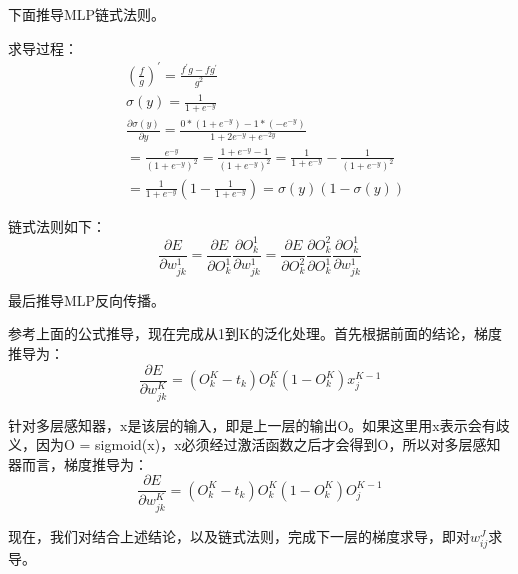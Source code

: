 \documentclass{ctexart}
\begin{document}
\par 下面推导MLP链式法则。
\par 求导过程：
\begin{equation}
    \begin{aligned}
    &\left(\frac{f}{g}\right)^{\prime}=\frac{f^{\prime} g-f g^{\prime}}{g^{2}} \\
    &\sigma(y)=\frac{1}{1+e^{-y}} \\
    &\frac{\partial \sigma(y)}{\partial y}=\frac{0 *\left(1+e^{-y}\right)-1 *\left(-e^{-y}\right)}{1+2 e^{-y}+e^{-2 y}} \\
    &=\frac{e^{-y}}{\left(1+e^{-y}\right)^{2}}=\frac{1+e^{-y}-1}{\left(1+e^{-y}\right)^{2}}=\frac{1}{1+e^{-y}}-\frac{1}{\left(1+e^{-y}\right)^{2}} \\
    &=\frac{1}{1+e^{-y}}\left(1-\frac{1}{1+e^{-y}}\right)=\sigma(y)(1-\sigma(y))
    \end{aligned}
    \end{equation}
\par 链式法则如下：
\begin{equation}
    \frac{\partial E}{\partial w_{j k}^{1}}=\frac{\partial E}{\partial O_{k}^{1}} \frac{\partial O_{k}^{1}}{\partial w_{j k}^{1}}=\frac{\partial E}{\partial O_{k}^{2}} \frac{\partial O_{k}^{2}}{\partial O_{k}^{1}} \frac{\partial O_{k}^{1}}{\partial w_{j k}^{1}}
\end{equation}
\par 最后推导MLP反向传播。
\par 参考上面的公式推导，现在完成从1到K的泛化处理。首先根据前面的结论，梯度推导为：
\begin{equation}
    \frac{\partial E}{\partial w_{j k}^{K}}=\left(O_{k}^{K}-t_{k}\right) O_{k}^{K}\left(1-O_{k}^{K}\right) x_{j}^{K-1}
    \end{equation}
\par 针对多层感知器，x是该层的输入，即是上一层的输出O。如果这里用x表示会有歧义，因为O = sigmoid(x)，x必须经过激活函数之后才会得到O，所以对多层感知器而言，梯度推导为：
\begin{equation}
    \frac{\partial E}{\partial w_{j k}^{K}}=\left(O_{k}^{K}-t_{k}\right) O_{k}^{K}\left(1-O_{k}^{K}\right) O_{j}^{K-1}
    \end{equation}
\par 现在，我们对结合上述结论，以及链式法则，完成下一层的梯度求导，即对$w_{i j}^{J}$求导。
\end{document}
